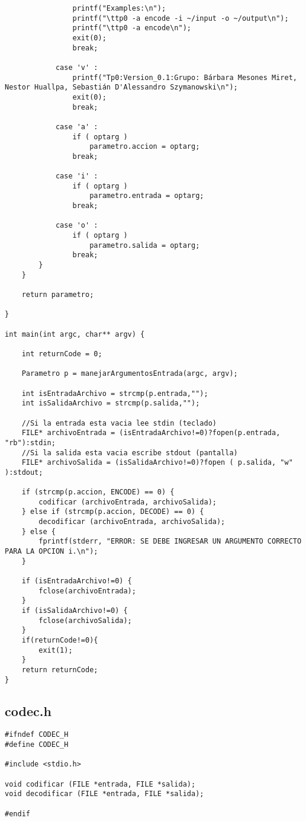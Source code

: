 \documentclass{article}
\begin{document}
\begin{verbatim}
                printf("Examples:\n");
                printf("\ttp0 -a encode -i ~/input -o ~/output\n");
                printf("\ttp0 -a encode\n");
                exit(0);
	            break;

            case 'v' :
                printf("Tp0:Version_0.1:Grupo: Bárbara Mesones Miret, Nestor Huallpa, Sebastián D'Alessandro Szymanowski\n");
                exit(0);
            	break;
            	
            case 'a' :
                if ( optarg )
               		parametro.accion = optarg;
            	break;
            	
            case 'i' :
                if ( optarg )
					parametro.entrada = optarg;
            	break;
            	
            case 'o' :
                if ( optarg )
					parametro.salida = optarg;
            	break;
        }
    }
    
    return parametro;

}

int main(int argc, char** argv) {

	int returnCode = 0;

	Parametro p = manejarArgumentosEntrada(argc, argv);
	
	int isEntradaArchivo = strcmp(p.entrada,"");
	int isSalidaArchivo = strcmp(p.salida,"");
	
	//Si la entrada esta vacia lee stdin (teclado)
	FILE* archivoEntrada = (isEntradaArchivo!=0)?fopen(p.entrada, "rb"):stdin; 
	//Si la salida esta vacia escribe stdout (pantalla)
	FILE* archivoSalida = (isSalidaArchivo!=0)?fopen ( p.salida, "w" ):stdout; 

	if (strcmp(p.accion, ENCODE) == 0) {
		codificar (archivoEntrada, archivoSalida);
	} else if (strcmp(p.accion, DECODE) == 0) {
		decodificar (archivoEntrada, archivoSalida);
	} else {
		fprintf(stderr, "ERROR: SE DEBE INGRESAR UN ARGUMENTO CORRECTO PARA LA OPCION i.\n");
	}

	if (isEntradaArchivo!=0) {
		fclose(archivoEntrada);
	}
	if (isSalidaArchivo!=0) {
		fclose(archivoSalida);
	}
	if(returnCode!=0){ 
	 	exit(1);
	}
	return returnCode;
}
\end{verbatim}

\subsection{codec.h}
\begin{verbatim}
#ifndef CODEC_H
#define CODEC_H

#include <stdio.h>

void codificar (FILE *entrada, FILE *salida);
void decodificar (FILE *entrada, FILE *salida);

#endif
\end{verbatim}
\end{document}
